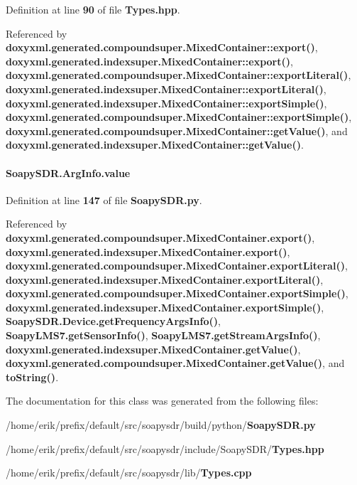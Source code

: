 Definition at line {\bf 90} of file {\bf Types.\+hpp}.



Referenced by {\bf doxyxml.\+generated.\+compoundsuper.\+Mixed\+Container\+::export()}, {\bf doxyxml.\+generated.\+indexsuper.\+Mixed\+Container\+::export()}, {\bf doxyxml.\+generated.\+compoundsuper.\+Mixed\+Container\+::export\+Literal()}, {\bf doxyxml.\+generated.\+indexsuper.\+Mixed\+Container\+::export\+Literal()}, {\bf doxyxml.\+generated.\+indexsuper.\+Mixed\+Container\+::export\+Simple()}, {\bf doxyxml.\+generated.\+compoundsuper.\+Mixed\+Container\+::export\+Simple()}, {\bf doxyxml.\+generated.\+compoundsuper.\+Mixed\+Container\+::get\+Value()}, and {\bf doxyxml.\+generated.\+indexsuper.\+Mixed\+Container\+::get\+Value()}.

\paragraph[{value}]{\setlength{\rightskip}{0pt plus 5cm}Soapy\+S\+D\+R.\+Arg\+Info.\+value\hspace{0.3cm}{\ttfamily [static]}}\label{classSoapySDR_1_1ArgInfo_adf1e19b3cd6c4617f417f6efe5db2ad5}


Definition at line {\bf 147} of file {\bf Soapy\+S\+D\+R.\+py}.



Referenced by {\bf doxyxml.\+generated.\+compoundsuper.\+Mixed\+Container.\+export()}, {\bf doxyxml.\+generated.\+indexsuper.\+Mixed\+Container.\+export()}, {\bf doxyxml.\+generated.\+compoundsuper.\+Mixed\+Container.\+export\+Literal()}, {\bf doxyxml.\+generated.\+indexsuper.\+Mixed\+Container.\+export\+Literal()}, {\bf doxyxml.\+generated.\+compoundsuper.\+Mixed\+Container.\+export\+Simple()}, {\bf doxyxml.\+generated.\+indexsuper.\+Mixed\+Container.\+export\+Simple()}, {\bf Soapy\+S\+D\+R.\+Device.\+get\+Frequency\+Args\+Info()}, {\bf Soapy\+L\+M\+S7.\+get\+Sensor\+Info()}, {\bf Soapy\+L\+M\+S7.\+get\+Stream\+Args\+Info()}, {\bf doxyxml.\+generated.\+indexsuper.\+Mixed\+Container.\+get\+Value()}, {\bf doxyxml.\+generated.\+compoundsuper.\+Mixed\+Container.\+get\+Value()}, and {\bf to\+String()}.



The documentation for this class was generated from the following files\+:\begin{DoxyCompactItemize}
\item 
/home/erik/prefix/default/src/soapysdr/build/python/{\bf Soapy\+S\+D\+R.\+py}\item 
/home/erik/prefix/default/src/soapysdr/include/\+Soapy\+S\+D\+R/{\bf Types.\+hpp}\item 
/home/erik/prefix/default/src/soapysdr/lib/{\bf Types.\+cpp}\end{DoxyCompactItemize}

